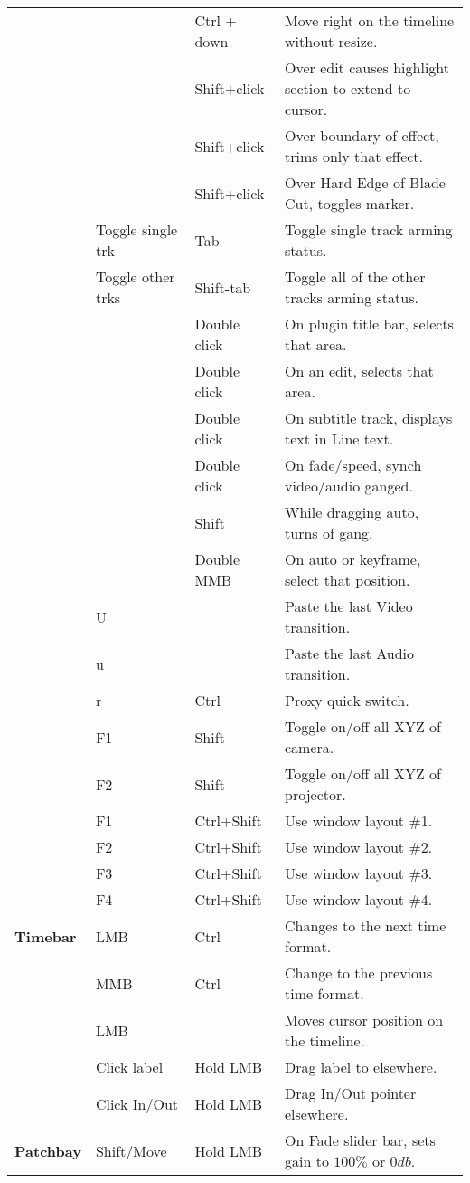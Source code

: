\begin{longtable}[h]{>{\bfseries}p{}p{}p{}p{}}
  &  & Ctrl + down & Move right on the timeline without resize. \\
  &  & Shift+click & Over edit causes highlight section to extend to cursor. \\
  &  & Shift+click & Over boundary of effect, trims only that effect. \\
  &  & Shift+click & Over Hard Edge of Blade Cut, toggles marker. \\
  & Toggle single trk & Tab & Toggle single track arming status. \\
  & Toggle other trks & Shift-tab & Toggle all of the other tracks arming status. \\
  &  & Double click & On plugin title bar, selects that area. \\
  &  & Double click & On an edit, selects that area. \\
  &  & Double click & On subtitle track, displays text in Line text. \\
  &  & Double click & On fade/speed, synch video/audio ganged. \\
  &  & Shift & While dragging auto, turns of gang. \\
  &  & Double MMB & On auto or keyframe, select that position. \\
  & U &  & Paste the last Video transition. \\
  & u &  & Paste the last Audio transition. \\
  & r & Ctrl & Proxy quick switch. \\
  & F1 & Shift & Toggle on/off all XYZ of camera. \\
  & F2 & Shift & Toggle on/off all XYZ of projector. \\
  & F1 & Ctrl+Shift & Use window layout \#1. \\
  & F2 & Ctrl+Shift & Use window layout \#2. \\
  & F3 & Ctrl+Shift & Use window layout \#3. \\
  & F4 & Ctrl+Shift & Use window layout \#4. \\
  \midrule
  \textcolor{CinBlueText}{Timebar} & LMB & Ctrl & Changes to the next time format. \\
  & MMB & Ctrl & Change to the previous time format. \\
  & LMB &  & Moves cursor position on the timeline. \\
  & Click label & Hold LMB & Drag label to elsewhere. \\
  & Click In/Out & Hold LMB & Drag In/Out pointer elsewhere. \\
  \midrule
  \textcolor{CinBlueText}{Patchbay} & Shift/Move & Hold LMB & On Fade slider bar, sets gain to $100\%$ or $0db$. \\
  \bottomrule
\end{longtable}


